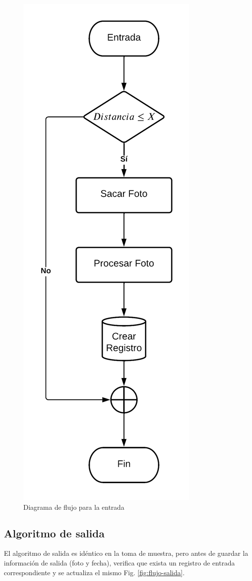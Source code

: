 \begin{figure}
    \centering
    \includegraphics[width=.5\textwidth]{imgs/flujo-entrada.png}
    \caption{Diagrama de flujo para la entrada}
    \label{fig:flujo-entrada}
\end{figure}

\subsection{Algoritmo de salida}

El algoritmo de salida es idéntico en la toma de muestra, pero antes de guardar la información de salida (foto y fecha), verifica que exista un registro de entrada correspondiente y se actualiza el mismo Fig. \ref{fig:flujo-salida}.

